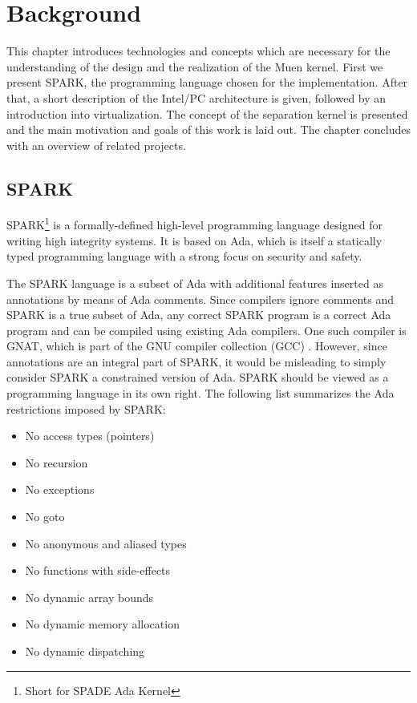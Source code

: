 \chapter{Background}
This chapter introduces technologies and concepts which are necessary for the
understanding of the design and the realization of the Muen kernel.  First we
present SPARK, the programming language chosen for the implementation.  After
that, a short description of the Intel/PC architecture is given, followed by an
introduction into virtualization. The concept of the separation kernel is
presented and the main motivation and goals of this work is laid out. The
chapter concludes with an overview of related projects.

\section{SPARK}\label{sec:spark}
SPARK\footnote{Short for SPADE Ada Kernel} is a formally-defined high-level
programming language designed for writing high integrity systems. It is based on
Ada, which is itself a statically typed programming language with a strong focus
on security and safety.

The SPARK language is a subset of Ada with additional features inserted as
annotations by means of Ada comments. Since compilers ignore comments and SPARK
is a true subset of Ada, any correct SPARK program is a correct Ada program and
can be compiled using existing Ada compilers. One such compiler is GNAT, which
is part of the GNU compiler collection (GCC) \cite{gcc}. However, since
annotations are an integral part of SPARK, it would be misleading to simply
consider SPARK a constrained version of Ada. SPARK should be viewed as a
programming language in its own right. The following list summarizes the Ada
restrictions imposed by SPARK:

\begin{itemize}
	\item No access types (pointers)
	\item No recursion
	\item No exceptions
	\item No goto
	\item No anonymous and aliased types
	\item No functions with side-effects
	\item No dynamic array bounds
	\item No dynamic memory allocation
	\item No dynamic dispatching
\end{itemize}

